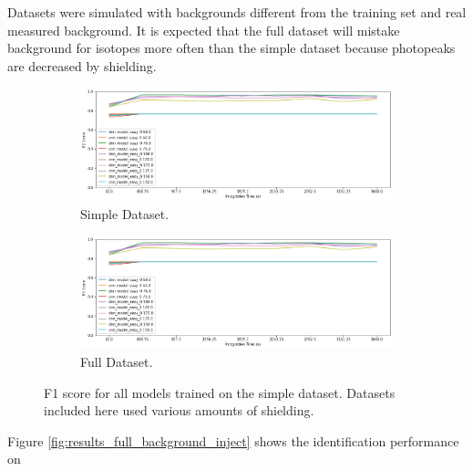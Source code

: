 Datasets were simulated with backgrounds different from the training set and real measured background. It is expected that the full dataset will mistake background for isotopes more often than the simple dataset because photopeaks are decreased by shielding.


\begin{figure}[H]
     \centering
     \begin{subfigure}[b]{0.9\textwidth}
         \centering
         \includegraphics[width=\textwidth]{images/results_easy_distance_comparison}
         \caption{Simple Dataset.}
         \label{fig:fig:results_easy_background_simulated_simple}
     \end{subfigure}

     \begin{subfigure}[b]{0.9\textwidth}
         \centering
         \includegraphics[width=\textwidth]{images/results_easy_distance_comparison}
         \caption{Full Dataset.}
         \label{fig:fig:results_easy_background_simulated_full}
     \end{subfigure}
        \caption{F1 score for all models trained on the simple dataset. Datasets included here used various amounts of shielding.}
        \label{fig:results_easy_background_simulated}
\end{figure}



Figure \ref{fig:results_full_background_inject} shows the identification performance on 

